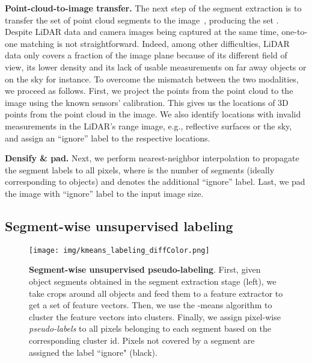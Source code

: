 \documentclass[runningheads]{llncs}
\newcommand{\paragraphcustom}[1]{\smallskip\noindent\textbf{#1}}
\begin{document}
\paragraphcustom{Point-cloud-to-image transfer.} 
The next step of the segment extraction is to transfer the set  of point cloud segments 
to the image~,
producing the set 
. Despite LiDAR data and camera images being captured at the same time, one-to-one matching is not straightforward. 
Indeed, among other difficulties, LiDAR data only covers a fraction of the image plane because of its different field of view, its lower density and its lack of usable measurements on far away objects or on the sky for instance.
To overcome the mismatch between the two modalities, we proceed as follows.  
First, we project the points from the point cloud to the image using the known sensors' calibration. This gives us the locations of 3D points from the point cloud in the image.  
We also identify locations with invalid measurements in the LiDAR's range image, 
e.g., reflective surfaces or the sky, 
and assign an ``ignore'' label to the respective locations.


\paragraphcustom{Densify \& pad.} 
Next, we perform nearest-neighbor interpolation to propagate the  segment labels to all pixels, where  is the number of segments (ideally corresponding to objects) and  denotes the additional ``ignore'' label. Last, we pad the image with ``ignore'' label to the input image size.

\subsection{Segment-wise unsupervised labeling}
\label{sec:clustering}

\begin{figure}[t]
    \centering
    \texttt{[image: img/kmeans\_labeling\_diffColor.png]}
    \vspace{-5ex}
    \caption{\small 
    \textbf{Segment-wise unsupervised pseudo-labeling}. First, given object segments  obtained in the segment extraction stage (left), we take crops around all  objects and feed them to 
    a
    feature extractor to get a set of  feature vectors. Then, we use the -means algorithm to cluster the feature vectors into  clusters. Finally, we assign pixel-wise {\em pseudo-labels} to all pixels belonging to each segment based on the corresponding cluster id. Pixels not covered by a segment are assigned the label ``ignore" (black).
    }
    
    \label{fig:labeling pipeline}
    \vspace{-3ex}
\end{figure}
\end{document}
